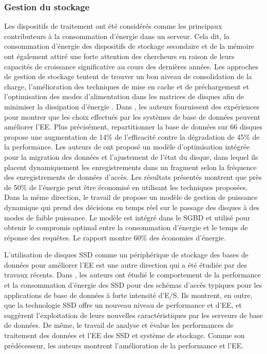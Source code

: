 \subsubsection{Gestion du stockage}
Les dispositifs de traitement ont été considérés comme les principaux contributeurs à la consommation d'énergie dans un serveur. Cela dit, la consommation d'énergie des dispositifs de stockage secondaire et de la mémoire ont également attiré une forte attention des chercheurs en raison de leurs capacités de croissance significative au cours des dernières années.
Les approches de gestion de stockage tentent de trouver un bon niveau de consolidation de la charge, l'amélioration des techniques de mise en cache et de préchargement et l'optimisation des modes d'alimentation dans les matrices de disques afin de minimiser la dissipation d'énergie \cite{Tu14}. Dans \cite{Harizopoulos09}, les auteurs fournissent des expériences pour montrer que les choix effectués par les systèmes de base de données peuvent améliorer l'EE. Plus précisément, repartitionner la base de données sur 66 disques propose une augmentation de 14\% de l'efficacité contre la dégradation de 45\% de la performance. Les auteurs de \cite{Tu14} ont proposé un modèle d'optimisation intégrée pour la migration des données et l'ajustement de l'état du disque, dans lequel ils placent dynamiquement les enregistrements dans un fragment selon la fréquence des enregistrements de données d'accès. Les résultats présentés montrent que près de 50\% de l'énergie peut être économisé en utilisant les techniques proposées. Dans la même direction, le travail de \cite{Behzadnia16} propose un modèle de gestion de puissance dynamique qui prend des décisions en temps réel sur le passage des disques à des modes de faible puissance. Le modèle est intégré dans le SGBD et utilisé pour obtenir le compromis optimal entre la consommation d'énergie et le temps de réponse des requêtes. Le rapport montre 60\% des économies d'énergie.

L'utilisation de disques SSD comme un périphérique de stockage des bases de données pour améliorer l'EE est une autre direction qui a été étudiée par des travaux récents. Dans \cite{Schall10}, les auteurs ont étudié le comportement de la performance et la consommation d'énergie des SSD pour des schémas d'accès typiques pour les applications de base de données à forte intensité d'E/S. Ils montrent, en outre, que la technologie SSD offre un nouveau niveau de performance et d'EE, et suggèrent l'exploitation de leurs nouvelles caractéristiques par les serveurs de base de données. De même, le travail de \cite {Cheong12} analyse et évalue les performances de traitement des données et l'EE des SSD et système de stockage. Comme son prédécesseur, les auteurs montrent l'amélioration de la performance et l'EE.

